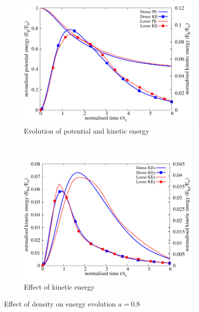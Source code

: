 \begin{figure}[tbhp]
\centering
\begin{subfigure}[b]{0.75\textwidth}
\centering
\includegraphics[width=\textwidth]{Energy_dense_r18}
\caption{Evolution of potential and kinetic energy}
\label{fig:Energy_dense_r18}
\end{subfigure}
\\
\begin{subfigure}[b]{0.75\textwidth}
\centering
\includegraphics[width=\textwidth]{KExy_dense_r18}
\caption{Effect of kinetic energy}
\label{fig:KExy_dense_r18}
\end{subfigure}
\caption{Effect of density on energy evolution $a = 0.8$}
\label{fig:Energy_density_r18}
\end{figure}


